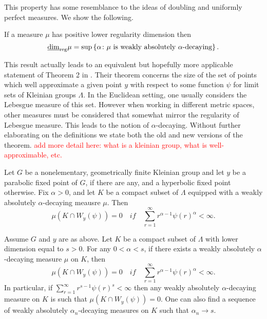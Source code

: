 This property has some resemblance to the ideas of doubling and uniformly perfect measures. We show the following.
\begin{proposition}\label{ch-quantifying:equiv-diophantine}
	If a measure $\mu$ has positive lower regularity dimension then 
	\[
	\underline{\dim}_{\textup{reg}} \mu = \sup\left\{\alpha \colon \mu \text{ is weakly absolutely $\alpha$-decaying}\right\}.
	\]
\end{proposition}

This result actually leads to an equivalent but hopefully more applicable statement of Theorem 2 in \cite{beres-sanju-al}. Their theorem concerns the size of the set of points which well approximate a given point $y$ with respect to some function $\psi$ for limit sets of Kleinian groups $\Lambda$. In the Euclidean setting, one usually considers the Lebesgue measure of this set. However when working in different metric spaces, other measures must be considered that somewhat mirror the regularity of Lebesgue measure. This leads to the notion of $\alpha$-decaying. Without further elaborating on the definitions we state both the old and new versions of the theorem. \textcolor{red}{add more detail here: what is a kleinian group, what is well-approximable, etc.}

\begin{theorem}
	Let $G$ be a nonelementary, geometrically finite Kleinian group and let $y$ be a parabolic fixed point of $G$, if there are any, and a hyperbolic fixed point otherwise. Fix $\alpha > 0$, and let $K$ be a compact subset of $\Lambda$ equipped with a weakly absolutely $\alpha$-decaying meausre $\mu$. Then
	\[
	\mu(K\cap W_y(\psi)) = 0 \quad if \quad \sum_{r=1}^\infty r^{\alpha-1} \psi(r)^{\alpha} < \infty.
	\]
\end{theorem}

\begin{theorem}
	Assume $G$ and $y$ are as above. Let $K$ be a compact subset of $\Lambda$ with lower dimension equal to $s > 0$. For any $0 < \alpha < s$, if there exists a weakly absolutely $\alpha$-decaying measure $\mu$ on $K$, then
	\[
	\mu(K\cap W_y(\psi)) = 0 \quad if \quad \sum_{r=1}^\infty r^{\alpha-1} \psi(r)^{\alpha} < \infty.
	\]
	In particular, if  $\sum_{r=1}^\infty r^{s-1} \psi(r)^{s} < \infty$ then any weakly absolutely $\alpha$-decaying measure on $K$ is such that $\mu(K\cap W_y(\psi)) = 0$. One can also find a sequence of weakly absolutely $\alpha_n$-decaying measures on $K$ such that $\alpha_n \rightarrow s$. 
\end{theorem}

